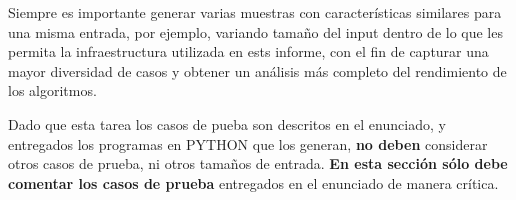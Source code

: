 
Siempre 
es importante generar varias muestras con características similares para una misma entrada, por ejemplo, variando tamaño del input dentro de lo que les permita la infraestructura utilizada en ests informe, con el fin de capturar una mayor diversidad de casos y obtener un análisis más completo del rendimiento de los algoritmos.
  
Dado que esta tarea los casos de pueba son descritos en el enunciado, y entregados los programas en PYTHON que los generan, \textbf{no deben} considerar otros casos de prueba, ni otros tamaños de entrada. \textbf{En esta sección sólo debe comentar los casos de prueba} entregados en el enunciado de manera crítica.

